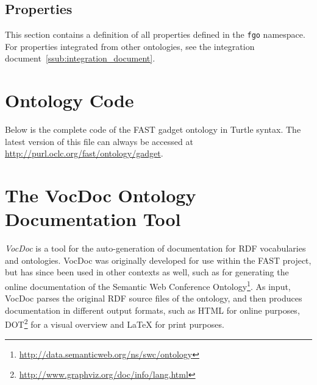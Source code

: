 \documentclass{article}
\begin{document}
\singlespacing
\begin{small}

\end{small}
\doublespacing


\subsection{Properties} %
\label{sub:properties}

This section contains a definition of all properties defined in the \texttt{fgo} namespace. For properties integrated from other ontologies, see the integration document~\ref{ssub:integration_document}.

\singlespacing
\begin{small}

\end{small}
\doublespacing



\clearpage
{}
\section{Ontology Code}
\label{sec:ontology_code}

Below is the complete code of the FAST gadget ontology in Turtle syntax. The latest version of this file can always be accessed at \url{http://purl.oclc.org/fast/ontology/gadget}.

\singlespacing
% 


\doublespacing
\clearpage
{}
\section{The VocDoc Ontology Documentation Tool}
\label{sec:vocdoc}

\emph{VocDoc} is a tool for the auto-generation of documentation for RDF vocabularies and ontologies. VocDoc was originally developed for use within the FAST project, but has since been used in other contexts as well, such as for generating the online documentation of the Semantic Web Conference Ontology\footnote{\url{http://data.semanticweb.org/ns/swc/ontology}}. As input, VocDoc parses the original RDF source files of the ontology, and then produces documentation in different output formats, such as HTML for online purposes, DOT\footnote{\url{http://www.graphviz.org/doc/info/lang.html}} for a visual overview and La\TeX{} for print purposes.
\end{document}
